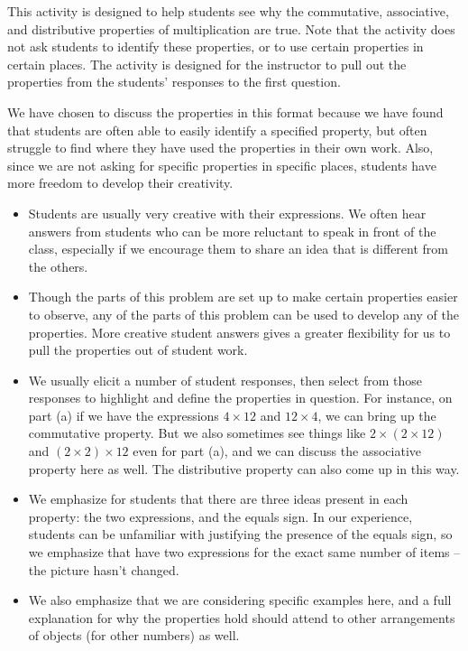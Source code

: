 \documentclass{ximera}
\begin{document}
\newpage
\begin{instructorNotes}
This activity is designed to help students see why the commutative, associative, and distributive properties of multiplication are true.  Note that the activity does not ask students to identify these properties, or to use certain properties in certain places.  The activity is designed for the instructor to pull out the properties from the students' responses to the first question.

We have chosen to discuss the properties in this format because we have found that students are often able to easily identify a specified property, but often struggle to find where they have used the properties in their own work.  Also, since we are not asking for specific properties in specific places, students have more freedom to develop their creativity.

\begin{itemize}
    \item Students are usually very creative with their expressions.  We often hear answers from students who can be more reluctant to speak in front of the class, especially if we encourage them to share an idea that is different from the others.
    \item Though the parts of this problem are set up to make certain properties easier to observe, any of the parts of this problem can be used to develop any of the properties.  More creative student answers gives a greater flexibility for us to pull the properties out of student work.
    \item We usually elicit a number of student responses, then select from those responses to highlight and define the properties in question.  For instance, on part (a) if we have the expressions $4 \times 12$ and $12 \times 4$, we can bring up the commutative property.  But we also sometimes see things like $2 \times (2\times 12)$ and $(2 \times 2) \times 12$ even for part (a), and we can discuss the associative property here as well.  The distributive property can also come up in this way.
    \item We emphasize for students that there are three ideas present in each property: the two expressions, and the equals sign.  In our experience, students can be unfamiliar with justifying the presence of the equals sign, so we emphasize that have two expressions for the exact same number of items -- the picture hasn't changed.
    \item We also emphasize that we are considering specific examples here, and a full explanation for why the properties hold should attend to other arrangements of objects (for other numbers) as well.
\end{itemize}



\end{instructorNotes}
\end{document}
